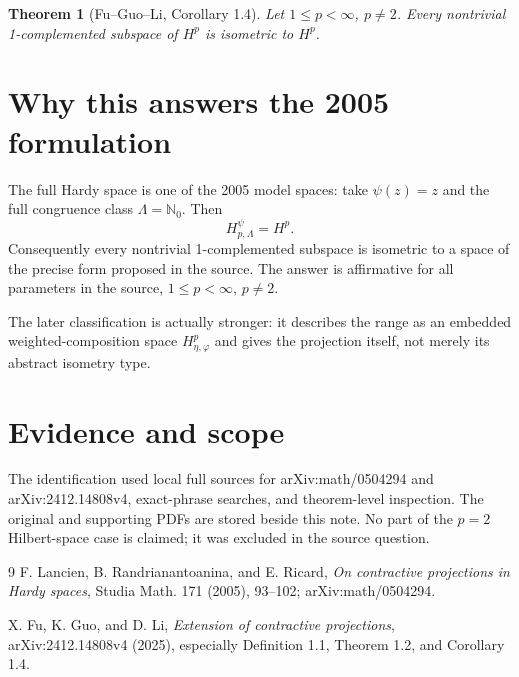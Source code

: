 \documentclass[11pt]{article}
\newtheorem{theorem}{Theorem}
\begin{document}
\begin{theorem}[Fu--Guo--Li, Corollary 1.4]
Let $1\le p<\infty$, $p\ne2$.  Every nontrivial 1-complemented subspace of
$H^p$ is isometric to $H^p$.
\end{theorem}

\section*{Why this answers the 2005 formulation}

The full Hardy space is one of the 2005 model spaces: take
$\psi(z)=z$ and the full congruence class $\Lambda=\mathbb N_0$.  Then
\[
 H^\psi_{p,\Lambda}=H^p.
\]
Consequently every nontrivial 1-complemented subspace is isometric to a space
of the precise form proposed in the source.  The answer is affirmative for
all parameters in the source, $1\le p<\infty$, $p\ne2$.

The later classification is actually stronger: it describes the range as an
embedded weighted-composition space $H^p_{\eta,\varphi}$ and gives the
projection itself, not merely its abstract isometry type.

\section*{Evidence and scope}

The identification used local full sources for arXiv:math/0504294 and
arXiv:2412.14808v4, exact-phrase searches, and theorem-level inspection.
The original and supporting PDFs are stored beside this note.  No part of the
$p=2$ Hilbert-space case is claimed; it was excluded in the source question.

{\small
\begin{thebibliography}{9}
F. Lancien, B. Randrianantoanina, and E. Ricard,
\emph{On contractive projections in Hardy spaces},
Studia Math. 171 (2005), 93--102; arXiv:math/0504294.

X. Fu, K. Guo, and D. Li,
\emph{Extension of contractive projections},
arXiv:2412.14808v4 (2025), especially Definition 1.1, Theorem 1.2,
and Corollary 1.4.
\end{thebibliography}
}
\end{document}
